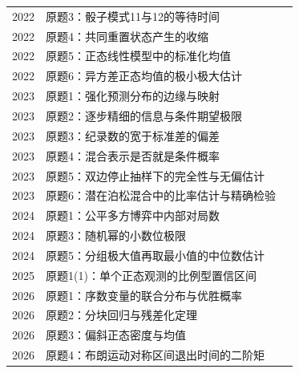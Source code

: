 \documentclass[UTF8,12pt,a4paper,fontset=fandol]{ctexbook}
\begin{document}
\begin{longtable}{@{}p{12mm}p{81mm}r@{}}
2022 & 原题3：骰子模式11与12的等待时间 & \pageref{yau:2022-3}\\

2022 & 原题4：共同重置状态产生的收缩 & \pageref{yau:2022-4}\\

2022 & 原题5：正态线性模型中的标准化均值 & \pageref{yau:2022-5}\\

2022 & 原题6：异方差正态均值的极小极大估计 & \pageref{yau:2022-6}\\

2023 & 原题1：强化预测分布的边缘与映射 & \pageref{yau:2023-1}\\

2023 & 原题2：逐步精细的信息与条件期望极限 & \pageref{yau:2023-2}\\

2023 & 原题3：纪录数的宽于标准差的偏差 & \pageref{yau:2023-3}\\

2023 & 原题4：混合表示是否就是条件概率 & \pageref{yau:2023-4}\\

2023 & 原题5：双边停止抽样下的完全性与无偏估计 & \pageref{yau:2023-5}\\

2023 & 原题6：潜在泊松混合中的比率估计与精确检验 & \pageref{yau:2023-6}\\

2024 & 原题1：公平多方博弈中内部对局数 & \pageref{yau:2024-1}\\

2024 & 原题3：随机幂的小数位极限 & \pageref{yau:2024-3}\\

2024 & 原题5：分组极大值再取最小值的中位数估计 & \pageref{yau:2024-5}\\

2025 & 原题1(1)：单个正态观测的比例型置信区间 & \pageref{yau:2025-1}\\

2026 & 原题1：序数变量的联合分布与优胜概率 & \pageref{yau:2026-1}\\

2026 & 原题2：分块回归与残差化定理 & \pageref{yau:2026-2}\\

2026 & 原题3：偏斜正态密度与均值 & \pageref{yau:2026-3}\\

2026 & 原题4：布朗运动对称区间退出时间的二阶矩 & \pageref{yau:2026-4}\\

\bottomrule\end{longtable}
\end{document}
